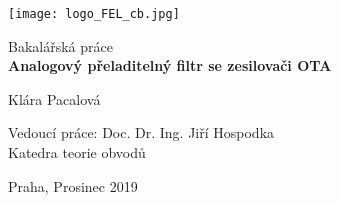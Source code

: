 \begin{titlepage}
    \begin{center}
    
        \texttt{[image: logo\_FEL\_cb.jpg]}
            
        \vspace*{3cm}
 	
        \Large Bakalářská práce \\
        \vspace*{1.5cm}
        \Huge
        \textbf{Analogový přeladitelný filtr se zesilovači OTA}
 
        \vspace{1cm}

        \Large{Klára Pacalová}
 
        \vfill
 
        \vspace{0.8cm}
 		
        \Large
 		Vedoucí práce: Doc. Dr. Ing. Jiří Hospodka\\
    		\large Katedra teorie obvodů\\
		
		\vspace{1.5cm}
		        
		\large Praha, Prosinec 2019
 
    \end{center}
\end{titlepage}